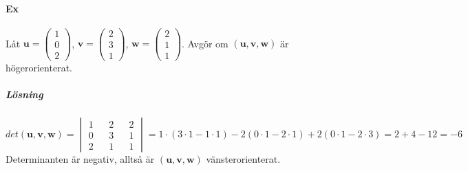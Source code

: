 \paragraph{Ex} Låt $\bm{u}=\begin{pmatrix}1\\0\\2\end{pmatrix}$, $\bm{v}=\begin{pmatrix}2\\3\\1\end{pmatrix}$, $\bm{w}=\begin{pmatrix}2\\1\\1\end{pmatrix}$.
Avgör om $(\bm{u},\bm{v},\bm{w})$ är högerorienterat.
\subparagraph{Lösning} 
\begin{equation*}
    det(\bm{u},\bm{v},\bm{w})=
    \begin{vmatrix}1&&2&&2\\0&&3&&1\\2&&1&&1\end{vmatrix}
    =1\cdot (3\cdot 1- 1\cdot 1)-2(0\cdot 1-2\cdot 1)+2(0\cdot 1-2\cdot 3)
    =2+4-12=-6
\end{equation*}
Determinanten är negativ, alltså är $(\bm{u},\bm{v},\bm{w})$ vänsterorienterat.

